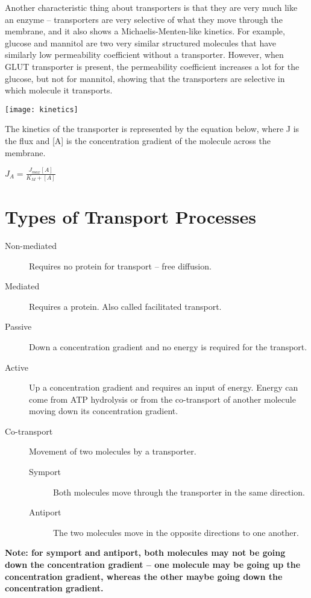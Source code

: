 Another characteristic thing about transporters is that they are very much like an enzyme -- transporters are very selective of what they move through the membrane, and it also shows a Michaelis-Menten-like kinetics.
For example, glucose and mannitol are two very similar structured molecules that have similarly low permeability coefficient without a transporter.
However, when GLUT transporter is present, the permeability coefficient increases a lot for the glucose, but not for mannitol, showing that the transporters are selective in which molecule it transports.

\begin{center}
\texttt{[image: kinetics]}
\end{center}

The kinetics of the transporter is represented by the equation below, where J is the flux and [A] is the concentration gradient of the molecule across the membrane.

\begin{center}
\large{$J_A = \frac{J_{max}[A]}{K_M + [A]}$}
\end{center}

\section{Types of Transport Processes}

\begin{description}
\item [Non-mediated] Requires no protein for transport -- free diffusion.
\item [Mediated] Requires a protein. Also called facilitated transport.
\item [Passive] Down a concentration gradient and no energy is required for the transport.
\item [Active] Up a concentration gradient and requires an input of energy. Energy can come from ATP hydrolysis or from the co-transport of another molecule moving down its concentration gradient.
\item [Co-transport] Movement of two molecules by a transporter.
\begin{description}
\item [Symport] Both molecules move through the transporter in the same direction.
\item [Antiport] The two molecules move in the opposite directions to one another.
\end{description}
\end{description}

\vspace{0.5cm}

\noindent
\textbf{Note: for symport and antiport, both molecules may not be going down the concentration gradient -- one molecule may be going up the concentration gradient, whereas the other maybe going down the concentration gradient.}


